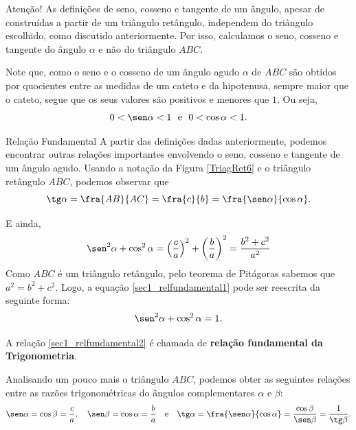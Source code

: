 \begin{observation}{Atenção!}
As definições de seno, cosseno e tangente de um ângulo, apesar de construídas a partir de um triângulo retângulo, independem do triângulo escolhido, como discutido anteriormente. Por isso, calculamos o seno, cosseno e tangente do ângulo $\alpha$ e não do triângulo $ABC$.
\end{observation}

Note que, como o seno e o cosseno de um ângulo agudo $\alpha$ de $ABC$ são obtidos por quocientes entre as medidas de um cateto e da hipotenusa, sempre maior que o cateto, segue que os seus valores são positivos e menores que $1$. Ou seja, 
$$0 < \sen\alpha < 1 \ \ \text{e}  \ \ 0  < \cos\alpha < 1.$$

\begin{observation}{Relação Fundamental}
A partir das definições dadas anteriormente, podemos encontrar outras relações importantes envolvendo o seno, cosseno e tangente de um ângulo agudo. Usando a notação da Figura \ref{TriagRet6} e o triângulo retângulo $ABC$, podemos observar que
$$\tg\alpha=\fra{AB}{AC}=\fra{c}{b}=\fra{\sen\alpha}{\cos\alpha}.$$

E ainda,
\begin{equation}\label{sec1_relfundamental1}
\sen^2\alpha+\cos^2\alpha=\left(\frac{c}{a}\right)^2+\left(\frac{b}{a}\right)^2=\frac{b^2+c^2}{a^2}
\end{equation}
Como $ABC$ é um triângulo retângulo, pelo teorema de Pitágoras sabemos que $a^2=b^2+c^2$. Logo, a equação \eqref{sec1_relfundamental1} pode ser reescrita da seguinte forma:
\begin{equation}\label{sec1_relfundamental2}
\sen^2\alpha+\cos^2\alpha=1.
\end{equation}

A relação \eqref{sec1_relfundamental2} é chamada de {\textbf{relação fundamental da Trigonometria}}.
\end{observation}

Analisando um pouco mais o triângulo $ABC$, podemos obter as seguintes relações entre as razões trigonométricas do ângulos complementares $\alpha$ e $\beta$:
$$\sen\alpha=\cos\beta=\frac{c}{a}, \quad  \sen\beta=\cos\alpha=\frac{b}{a} \quad \text{e} \quad \tg\alpha=\fra{\sen\alpha}{\cos\alpha}=\frac{\cos\beta}{\sen\beta}=\frac{1}{\tg\beta}.$$
    
